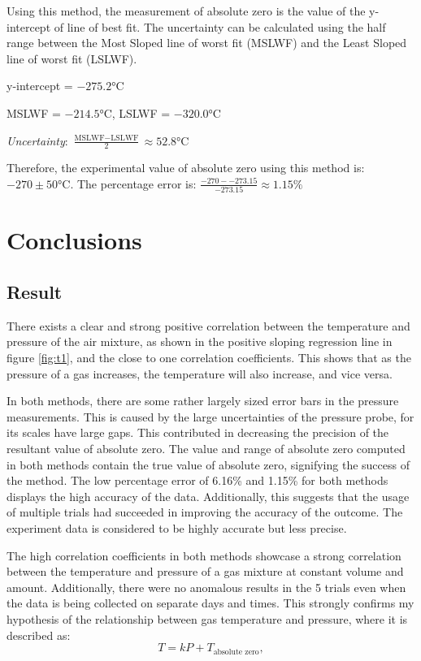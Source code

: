 \documentclass[a4paper,12pt]{article}
\begin{document}
Using this method, the measurement of absolute zero is the value of the y-intercept of line of best fit. The uncertainty can be calculated using the half range between the Most Sloped line of worst fit (MSLWF) and the Least Sloped line of worst fit (LSLWF).

y-intercept = $-275.2\si{\celsius}$

MSLWF = $-214.5\si{\celsius}$, LSLWF = $-320.0\si{\celsius}$

\textit{Uncertainty}: $\frac{\text{MSLWF} - \text{LSLWF}}{2} \approx 52.8 \si{\celsius}$

Therefore, the experimental value of absolute zero using this method is: $-270 \pm 50 \si{\celsius}$. The percentage error is: $\frac{-270 - -273.15}{-273.15} \approx 1.15\%$

\section{Conclusions}
\subsection{Result}
There exists a clear and strong positive correlation between the temperature and pressure of the air mixture, as shown in the positive sloping regression line in figure \ref{fig:t1}, and the close to one correlation coefficients. This shows that as the pressure of a gas increases, the temperature will also increase, and vice versa.

In both methods, there are some rather largely sized error bars in the pressure measurements. This is caused by the large uncertainties of the pressure probe, for its scales have large gaps. This contributed in decreasing the precision of the resultant value of absolute zero.
The value and range of absolute zero computed in both methods contain the true value of absolute zero, signifying the success of the method. The low percentage error of 6.16\% and 1.15\% for both methods displays the high accuracy of the data. Additionally, this suggests that the usage of multiple trials had succeeded in improving the accuracy of the outcome. The experiment data is considered to be highly accurate but less precise.

The high correlation coefficients in both methods showcase a strong correlation between the temperature and pressure of a gas mixture at constant volume and amount. Additionally, there were no anomalous results in the 5 trials even when the data is being collected on separate days and times. This strongly confirms my hypothesis of the relationship between gas temperature and pressure, where it is described as:
\[
    T = kP + T_{\text{absolute zero}},
\]
\end{document}
